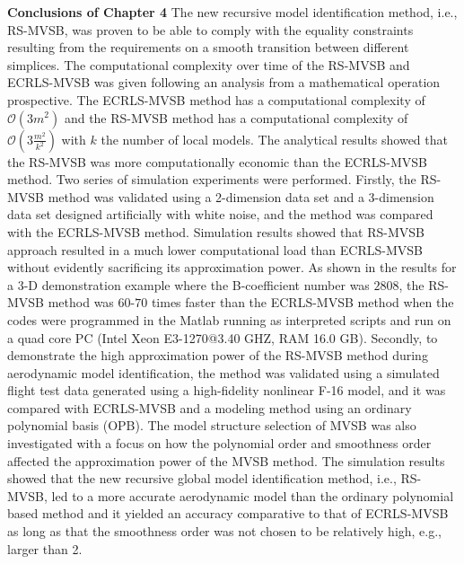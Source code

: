 \noindent \textbf{Conclusions of Chapter 4}  The new recursive model identification method, i.e., RS-MVSB, was proven to be able to comply with the equality constraints resulting from the requirements on a smooth transition between different simplices. The computational complexity over time of the RS-MVSB and ECRLS-MVSB was given following an analysis from a mathematical operation prospective. The ECRLS-\ac{MVSB} method has a computational complexity of $\mathcal{O}\left(3m^2\right)$ and the RS-\ac{MVSB} method has a computational complexity of $\mathcal{O}\left( 3 \frac{m^2}{k^2}\right)$ with $k$ the number of local models. The analytical results showed that the RS-\ac{MVSB} was more computationally economic than the ECRLS-\ac{MVSB} method. 
Two series of simulation experiments were performed.
Firstly, the RS-MVSB method was validated using a 2-dimension data set and a 3-dimension data set designed artificially with white noise, and the method was compared with the ECRLS-MVSB method. Simulation results showed that RS-MVSB approach resulted in a much lower computational load than ECRLS-\ac{MVSB} without evidently sacrificing its approximation power. As shown in the results for a 3-D demonstration example where the B-coefficient number was $2808$, the RS-\ac{MVSB} method was $60$-$70$ times faster than the ECRLS-\ac{MVSB} method when the codes were programmed in the Matlab running as interpreted scripts and run on a quad core PC (Intel Xeon E3-1270@3.40 GHZ, RAM 16.0 GB).
Secondly, to demonstrate the high approximation power of the RS-MVSB method during aerodynamic model identification, the method was validated using a simulated flight test data generated using a high-fidelity nonlinear F-16 model, and it was compared with ECRLS-MVSB and a modeling method using an ordinary polynomial basis (OPB). The model structure selection of \ac{MVSB} was also investigated with a focus on how the polynomial order and smoothness order affected the approximation power of the \ac{MVSB} method. The simulation results showed that the new recursive global model identification method, i.e., RS-MVSB, led to a more accurate aerodynamic model than the ordinary polynomial based method and it yielded an accuracy comparative to that of ECRLS-MVSB as long as that the smoothness order was not chosen to be relatively high, e.g., larger than 2.

\begin{shaded}
\end{shaded}
\vspace{-0.95cm}
\begin{shaded}
\end{shaded}


